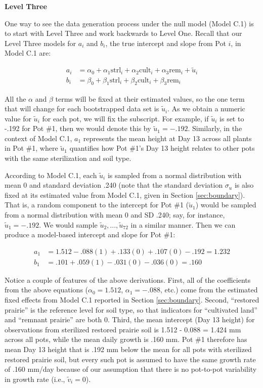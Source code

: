 \documentclass[
]{krantz}
\begin{document}
\textbf{Level Three}

One way to see the data generation process under the null model (Model C.1) is to start with Level Three and work backwards to Level One. Recall that our Level Three models for \(a_{i}\) and \(b_{i}\), the true intercept and slope from Pot \(i\), in Model C.1 are:

\begin{align*}
a_{i} & = \alpha_{0}+\alpha_{1}\textrm{strl}_{i}+\alpha_{2}\textrm{cult}_{i}+\alpha_{3}\textrm{rem}_{i}+\tilde{u}_{i} \\
b_{i} & = \beta_{0}+\beta_{1}\textrm{strl}_{i}+\beta_{2}\textrm{cult}_{i}+\beta_{3}\textrm{rem}_{i}
\end{align*}

All the \(\alpha\) and \(\beta\) terms will be fixed at their estimated values, so the one term that will change for each bootstrapped data set is \(\tilde{u}_{i}\). As we obtain a numeric value for \(\tilde{u}_{i}\) for each pot, we will fix the subscript. For example, if \(\tilde{u}_{i}\) is set to -.192 for Pot \#1, then we would denote this by \(\tilde{u}_{1}=-.192\). Similarly, in the context of Model C.1, \(a_{1}\) represents the mean height at Day 13 across all plants in Pot \#1, where \(\tilde{u}_{1}\) quantifies how Pot \#1's Day 13 height relates to other pots with the same sterilization and soil type.

According to Model C.1, each \(\tilde{u}_{i}\) is sampled from a normal distribution with mean 0 and standard deviation .240 (note that the standard deviation \(\sigma_{u}\) is also fixed at its estimated value from Model C.1, given in Section \ref{sec:boundary}). That is, a random component to the intercept for Pot \#1 (\(\tilde{u}_{1}\)) would be sampled from a normal distribution with mean 0 and SD .240; say, for instance, \(\tilde{u}_{1}=-.192\). We would sample \(\tilde{u}_{2},...,\tilde{u}_{72}\) in a similar manner. Then we can produce a model-based intercept and slope for Pot \#1:

\begin{align*}
a_{1} & = 1.512-.088(1)+.133(0)+.107(0)-.192 = 1.232 \\
b_{1} & = .101+.059(1)-.031(0)-.036(0) = .160
\end{align*}

Notice a couple of features of the above derivations. First, all of the coefficients from the above equations (\(\alpha_{0}=1.512\), \(\alpha_{1}=-.088\), etc.) come from the estimated fixed effects from Model C.1 reported in Section \ref{sec:boundary}. Second, ``restored prairie'' is the reference level for soil type, so that indicators for ``cultivated land'' and ``remnant prairie'' are both 0. Third, the mean intercept (Day 13 height) for observations from sterilized restored prairie soil is 1.512 - 0.088 = 1.424 mm across all pots, while the mean daily growth is .160 mm. Pot \#1 therefore has mean Day 13 height that is .192 mm below the mean for all pots with sterilized restored prairie soil, but every such pot is assumed to have the same growth rate of .160 mm/day because of our assumption that there is no pot-to-pot variability in growth rate (i.e., \(\tilde{v}_{i}=0\)).
\end{document}
